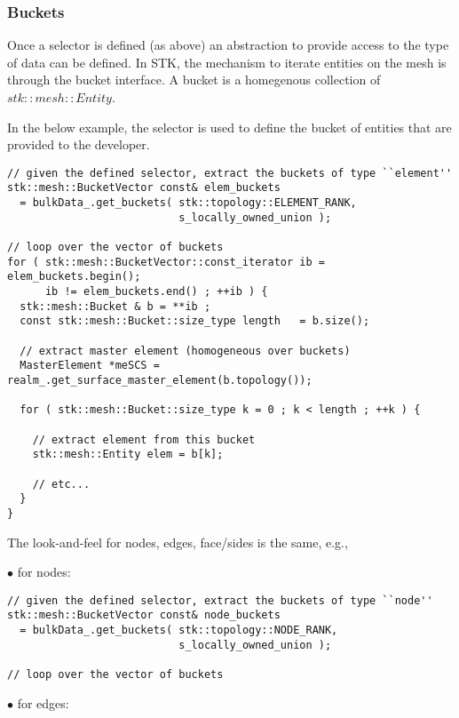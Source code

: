 \subsubsection{Buckets}
Once a selector is defined (as above) an abstraction to provide access to the type of 
data can be defined. In STK, the mechanism to iterate entities on the mesh is through the 
bucket interface. A bucket is a homegenous collection of $stk::mesh::Entity$.

In the below example, the selector is used to define the bucket of entities that are provided
to the developer.

\begin{lstlisting}
// given the defined selector, extract the buckets of type ``element''
stk::mesh::BucketVector const& elem_buckets 
  = bulkData_.get_buckets( stk::topology::ELEMENT_RANK, 
                           s_locally_owned_union );

// loop over the vector of buckets 
for ( stk::mesh::BucketVector::const_iterator ib = elem_buckets.begin();
      ib != elem_buckets.end() ; ++ib ) {
  stk::mesh::Bucket & b = **ib ;
  const stk::mesh::Bucket::size_type length   = b.size();

  // extract master element (homogeneous over buckets)
  MasterElement *meSCS = realm_.get_surface_master_element(b.topology());
  
  for ( stk::mesh::Bucket::size_type k = 0 ; k < length ; ++k ) {
    
    // extract element from this bucket
    stk::mesh::Entity elem = b[k];
    
    // etc...
  }
}

\end{lstlisting}

The look-and-feel for nodes, edges, face/sides is the same, e.g.,

\begin{description}
\item[$\bullet$ for nodes:]
\end{description}

\begin{lstlisting}
// given the defined selector, extract the buckets of type ``node''
stk::mesh::BucketVector const& node_buckets 
  = bulkData_.get_buckets( stk::topology::NODE_RANK, 
                           s_locally_owned_union );

// loop over the vector of buckets 
\end{lstlisting}

\begin{description}
\item[$\bullet$ for edges:]
\end{description}

